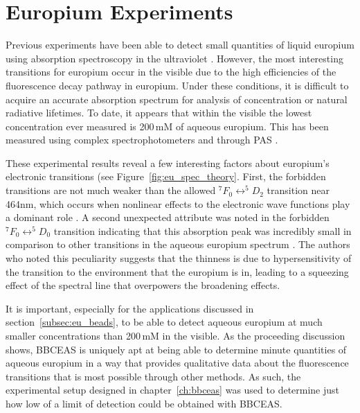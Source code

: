\chapter{Europium Experiments}\label{ch:eu_exp}

Previous experiments have been able to detect small quantities of liquid
europium using absorption spectroscopy in the ultraviolet \cite{Yun:2001wc}.
However, the most interesting transitions for europium occur in the visible due
to the high efficiencies of the fluorescence decay pathway in europium. Under
these conditions, it is difficult to acquire an accurate absorption spectrum
for analysis of concentration or natural radiative lifetimes. To date, it
appears that within the visible the lowest concentration ever measured is
200\,mM of aqueous europium. This has been measured using complex
spectrophotometers and through \ac{PAS} \cite{Sawada:1979vca}.

These experimental results reveal a few interesting factors about
europium's electronic transitions (see Figure~\ref{fig:eu_spec_theory}.
First, the forbidden transitions are not much weaker than the allowed
$^7F_0 \leftrightarrow ^5D_2$ transition near 464nm, which occurs when
nonlinear effects to the electronic wave functions play a dominant role
\cite{Walsh:2005te}. A second unexpected attribute was noted in the forbidden
$^7F_0 \leftrightarrow ^5D_0$ transition indicating that this absorption
peak was incredibly small in comparison to other transitions in the aqueous
europium spectrum \cite{Sawada:1979vca}. The authors who noted this
peculiarity suggests that the thinness is due to hypersensitivity of the
transition to the environment that the europium is in, leading to a squeezing
effect of the spectral line that overpowers the broadening effects.

It is important, especially for the applications discussed in
section~\ref{subsec:eu_beads}, to be able to detect aqueous europium at
much smaller concentrations than 200\,mM in the visible. As the proceeding
discussion shows, \ac{BBCEAS} is uniquely apt at being able to determine
minute quantities of aqueous europium in a way that provides qualitative
data about the fluorescence transitions that is most possible through other
methods. As such, the experimental setup designed in chapter~\ref{ch:bbceas}
was used to determine just how low of a limit of detection could be obtained
with \ac{BBCEAS}.




